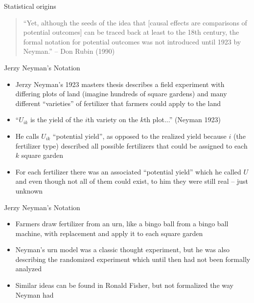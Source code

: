 \documentclass{beamer}
\begin{document}
\begin{frame}{Statistical origins}

\begin{quote}
``Yet, although the seeds of the idea that [causal effects are comparisons of potential outcomes] can be traced back at least to the 18th century, the formal notation for potential outcomes was not introduced until 1923 by Neyman.'' -- Don Rubin (1990)
\end{quote}

\end{frame}


\begin{frame}{Jerzy Neyman's Notation}

\begin{itemize}
\item Jerzy Neyman's 1923 masters thesis describes a field experiment with differing plots of land (imagine hundreds of square gardens) and many different ``varieties'' of fertilizer that farmers could apply to the land
\item ``$U_{ik}$ is the yield of the $i$th variety on the $k$th plot...'' (Neyman 1923)
\item He calls $U_{ik}$ ``potential yield'', as opposed to the realized yield because $i$ (the fertilizer type) described all possible fertilizers that could be assigned to each $k$ square garden
\item For each fertilizer there was an associated ``potential yield'' which he called $U$ and even though not all of them could exist, to him they were still real -- just unknown
\end{itemize}

\end{frame}

\begin{frame}{Jerzy Neyman's Notation}

\begin{itemize}

\item Farmers draw fertilizer from an urn, like a bingo ball from a bingo ball machine, with replacement and apply it to each square garden
\item Neyman's urn model was a classic thought experiment, but he was also describing the randomized experiment which until then had not been formally analyzed
\item Similar ideas can be found in Ronald Fisher, but not formalized the way Neyman had
\end{itemize}

\end{frame}
\end{document}
